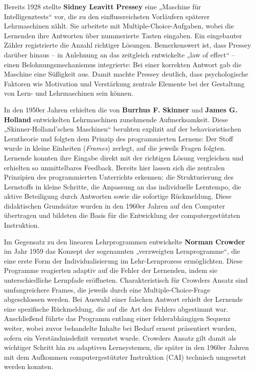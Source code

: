 Bereits 1928 stellte \textbf{Sidney Leavitt Pressey} eine „Maschine für Intelligenztests“ vor, die zu den einflussreichsten Vorläufern späterer Lehrmaschinen zählt. Sie arbeitete mit Multiple-Choice-Aufgaben, wobei die Lernenden ihre Antworten über nummerierte Tasten eingaben. Ein eingebauter Zähler registrierte die Anzahl richtiger Lösungen. Bemerkenswert ist, dass Pressey darüber hinaus -- in Anlehnung an das zeitgleich entwickelte „law of effect“ -- einen Belohnungsmechanismus integrierte: Bei einer korrekten Antwort gab die Maschine eine Süßigkeit aus. Damit machte Pressey deutlich, dass psychologische Faktoren wie Motivation und Verstärkung zentrale Elemente bei der Gestaltung von Lern- und Lehrmaschinen sein können.\parencite[S.~705]{benjamin_history_1988}\parencite[S.~969f]{skinner_teaching_1958}

In den 1950er Jahren erhielten die von \textbf{Burrhus F. Skinner} und \textbf{James G. Holland} entwickelten Lehrmaschinen zunehmende Aufmerksamkeit. Diese „Skinner-Holland’schen Maschinen“ beruhten explizit auf der behavioristischen Lerntheorie und folgten dem Prinzip des programmierten Lernens: Der Stoff wurde in kleine Einheiten (\textit{Frames}) zerlegt, auf die jeweils Fragen folgten. Lernende konnten ihre Eingabe direkt mit der richtigen Lösung vergleichen und erhielten so unmittelbares Feedback.\parencite[S.~970--977]{skinner_teaching_1958} Bereits hier lassen sich die zentralen Prinzipien des programmierten Unterrichts erkennen: die Strukturierung des Lernstoffs in kleine Schritte, die Anpassung an das individuelle Lerntempo, die aktive Beteiligung durch Antworten sowie die sofortige Rückmeldung.\parencite[S.~1971]{bruillard_teaching_2020} Diese didaktischen Grundsätze wurden in den 1960er Jahren auf den Computer übertragen und bildeten die Basis für die Entwicklung der computergestützten Instruktion.

Im Gegensatz zu den linearen Lehrprogrammen entwickelte \textbf{Norman Crowder} im Jahr 1959 das Konzept der sogenannten „verzweigten Lernprogramme“, die eine erste Form der Individualisierung im Lehr-Lernprozess ermöglichten. Diese Programme reagierten adaptiv auf die Fehler der Lernenden, indem sie unterschiedliche Lernpfade eröffneten. Charakteristisch für Crowders Ansatz sind umfangreichere Frames, die jeweils durch eine Multiple-Choice-Frage abgeschlossen werden. Bei Auswahl einer falschen Antwort erhielt der Lernende eine spezifische Rückmeldung, die auf die Art des Fehlers abgestimmt war. Anschließend führte das Programm entlang einer fehlerabhängigen Sequenz weiter, wobei zuvor behandelte Inhalte bei Bedarf erneut präsentiert wurden, sofern ein Verständnisdefizit vermutet wurde.\parencite[S.~252--254]{crowder_differences_1963}\parencite[S.~9]{schonfeld_computerbasiertes_2006} Crowders Ansatz gilt damit als wichtiger Schritt hin zu adaptiven Lernsystemen, die später in den 1960er Jahren mit dem Aufkommen computergestützter Instruktion (CAI) technisch umgesetzt werden konnten.


